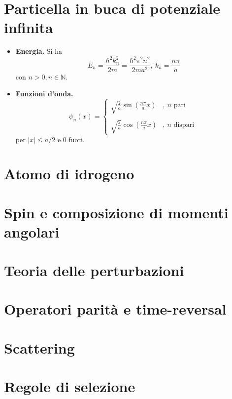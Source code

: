 \documentclass[11pt, a4paper]{scrartcl} %
\numberwithin{equation}{section}
\theoremstyle{style2}
\theoremstyle{style1}
\begin{document}
\section{Particella in buca di potenziale infinita}
\begin{multicols}{2}
	\begin{itemize}
		\item {\sffamily \bfseries Energia.} 
			Si ha 
			\begin{equation}
				E_n = \frac{\hbar ^2 k_n^2}{2m} = \frac{\hbar ^2 \pi ^2 n ^2}{2ma^2}, \ k_n = \frac{n\pi }{a}
			\end{equation}
			con $n > 0 , n \in \mathbb{N}$.
			\item {\sffamily \bfseries Funzioni d'onda.} 
				\begin{equation}
					\psi _n(x) = \begin{cases}
						\displaystyle \sqrt{\frac{2}{a}} \sin \left(\frac{n\pi }{a}x\right) &,\ n \text{ pari }\\
						\\
						\displaystyle \sqrt{\frac{2}{a}} \cos \left(\frac{n\pi}{a}x\right) &,\ n \text{ dispari }
					\end{cases}
				\end{equation}
				per $\lvert x \rvert \le a /2 $ e $0$ fuori. 
	\end{itemize}
\end{multicols}
\section{Atomo di idrogeno}
\section{Spin e composizione di momenti angolari}
\section{Teoria delle perturbazioni}
\section{Operatori parit\`a e time-reversal}
\section{Scattering}
\section{Regole di selezione}
\newpage
\end{document}
